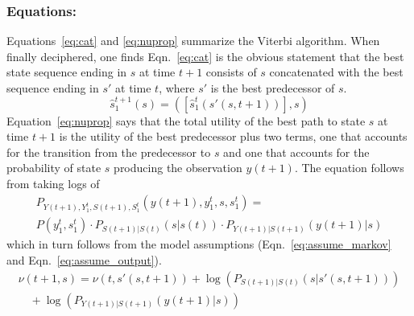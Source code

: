 \documentclass[]{article}
\newcommand{\ts}[3]{#1_{#2}^{#3}}                    %
\newcommand{\ti}[2]{{#1}{(#2)}}                  %
\begin{document}
\subsubsection*{Equations:}
Equations~\eqref{eq:cat} and \eqref{eq:nuprop} summarize the Viterbi
algorithm.  When finally deciphered, one finds Eqn.~\eqref{eq:cat} is
the obvious statement that the best state sequence ending in $s$ at
time $t+1$ consists of $s$ concatenated with the best sequence ending
in $s'$ at time $t$, where $s'$ is the best predecessor of $s$.
\begin{equation}
  \label{eq:cat}
  \ts{\hat s}{1}{t+1} (s) = \left( \left[\ts{\hat s}{1}{t}
      (s'(s,t+1))\right],s \right)
\end{equation}
Equation~\eqref{eq:nuprop} says that the total utility of the best
path to state $s$ at time $t+1$ is the utility of the best
predecessor plus two terms, one that accounts for the transition from
the predecessor to $s$ and one that accounts for the probability of
state $s$ producing the observation $\ti{y}{t+1}$.  The equation
follows from taking logs of
\begin{multline*}
  P_{\ti{Y}{t+1},\ts{Y}{1}{t},\ti{S}{t+1},\ts{S}{1}{t}}
  \left(\ti{y}{t+1},\ts{y}{1}{t},s,\ts{s}{1}{t} \right) =\\
  P\left(\ts{y}{1}{t}, \ts{s}{1}{t} \right) \cdot
  P_{\ti{S}{t+1}|\ti{S}{t}} \left(s|\ti{s}{t} \right) \cdot
  P_{\ti{Y}{t+1}|\ti{S}{t+1}} \left(\ti{y}{t+1}|s \right)
\end{multline*}
which in turn follows from the model assumptions
(Eqn.~\eqref{eq:assume_markov} and Eqn.~\eqref{eq:assume_output}).
\begin{equation}
  \label{eq:nuprop}
  \begin{split}
    \nu (t+1,s) = \nu(t,s'(s,t+1)) +
    \log\left(P_{\ti{S}{t+1}|\ti{S}{t}} \left(s|s'(s,t+1) \right)\right)\\
    \quad + \log \left( P_{\ti{Y}{t+1}|\ti{S}{t+1}}
      \left(\ti{y}{t+1}|s\right)\right)
  \end{split}
\end{equation}
\end{document}
